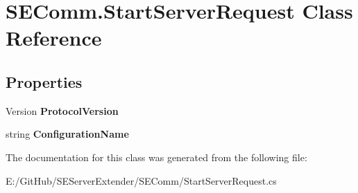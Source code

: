 \hypertarget{class_s_e_comm_1_1_start_server_request}{}\section{S\+E\+Comm.\+Start\+Server\+Request Class Reference}
\label{class_s_e_comm_1_1_start_server_request}
\subsection*{Properties}
\begin{DoxyCompactItemize}
\item 
\hypertarget{class_s_e_comm_1_1_start_server_request_a7b184a1d2270c1b9f4521620c3a6fb07}{}Version {\bfseries Protocol\+Version}\label{class_s_e_comm_1_1_start_server_request_a7b184a1d2270c1b9f4521620c3a6fb07}

\item 
\hypertarget{class_s_e_comm_1_1_start_server_request_a31e93b4b33cc247992c18a71166e135a}{}string {\bfseries Configuration\+Name}\label{class_s_e_comm_1_1_start_server_request_a31e93b4b33cc247992c18a71166e135a}

\end{DoxyCompactItemize}


The documentation for this class was generated from the following file\+:\begin{DoxyCompactItemize}
\item 
E\+:/\+Git\+Hub/\+S\+E\+Server\+Extender/\+S\+E\+Comm/Start\+Server\+Request.\+cs\end{DoxyCompactItemize}
